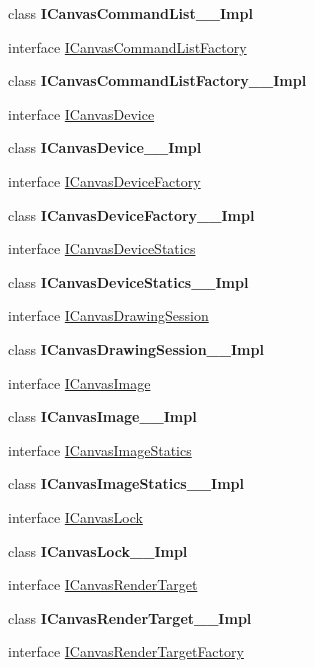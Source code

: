 \begin{DoxyCompactItemize}
\item 
class {\bfseries I\+Canvas\+Command\+List\+\_\+\+\_\+\+Impl}
\item 
interface \hyperlink{interface_microsoft_1_1_graphics_1_1_canvas_1_1_i_canvas_command_list_factory}{I\+Canvas\+Command\+List\+Factory}
\item 
class {\bfseries I\+Canvas\+Command\+List\+Factory\+\_\+\+\_\+\+Impl}
\item 
interface \hyperlink{interface_microsoft_1_1_graphics_1_1_canvas_1_1_i_canvas_device}{I\+Canvas\+Device}
\item 
class {\bfseries I\+Canvas\+Device\+\_\+\+\_\+\+Impl}
\item 
interface \hyperlink{interface_microsoft_1_1_graphics_1_1_canvas_1_1_i_canvas_device_factory}{I\+Canvas\+Device\+Factory}
\item 
class {\bfseries I\+Canvas\+Device\+Factory\+\_\+\+\_\+\+Impl}
\item 
interface \hyperlink{interface_microsoft_1_1_graphics_1_1_canvas_1_1_i_canvas_device_statics}{I\+Canvas\+Device\+Statics}
\item 
class {\bfseries I\+Canvas\+Device\+Statics\+\_\+\+\_\+\+Impl}
\item 
interface \hyperlink{interface_microsoft_1_1_graphics_1_1_canvas_1_1_i_canvas_drawing_session}{I\+Canvas\+Drawing\+Session}
\item 
class {\bfseries I\+Canvas\+Drawing\+Session\+\_\+\+\_\+\+Impl}
\item 
interface \hyperlink{interface_microsoft_1_1_graphics_1_1_canvas_1_1_i_canvas_image}{I\+Canvas\+Image}
\item 
class {\bfseries I\+Canvas\+Image\+\_\+\+\_\+\+Impl}
\item 
interface \hyperlink{interface_microsoft_1_1_graphics_1_1_canvas_1_1_i_canvas_image_statics}{I\+Canvas\+Image\+Statics}
\item 
class {\bfseries I\+Canvas\+Image\+Statics\+\_\+\+\_\+\+Impl}
\item 
interface \hyperlink{interface_microsoft_1_1_graphics_1_1_canvas_1_1_i_canvas_lock}{I\+Canvas\+Lock}
\item 
class {\bfseries I\+Canvas\+Lock\+\_\+\+\_\+\+Impl}
\item 
interface \hyperlink{interface_microsoft_1_1_graphics_1_1_canvas_1_1_i_canvas_render_target}{I\+Canvas\+Render\+Target}
\item 
class {\bfseries I\+Canvas\+Render\+Target\+\_\+\+\_\+\+Impl}
\item 
interface \hyperlink{interface_microsoft_1_1_graphics_1_1_canvas_1_1_i_canvas_render_target_factory}{I\+Canvas\+Render\+Target\+Factory}

\end{DoxyCompactItemize}
